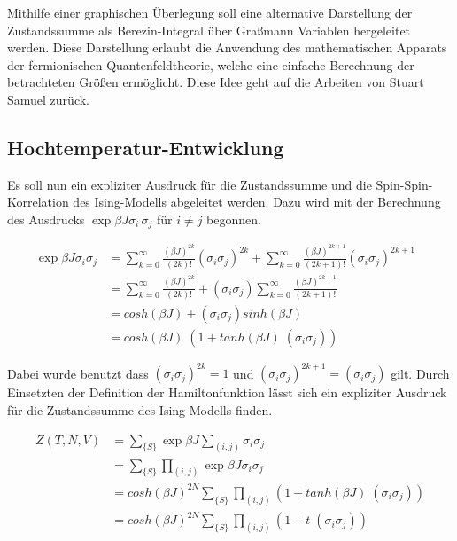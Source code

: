 Mithilfe einer graphischen Überlegung soll eine alternative Darstellung der Zustandssumme als Berezin-Integral über Graßmann Variablen hergeleitet werden. Diese Darstellung erlaubt die Anwendung des mathematischen Apparats der fermionischen Quantenfeldtheorie, welche eine einfache Berechnung der betrachteten Größen ermöglicht. Diese Idee geht auf die Arbeiten von Stuart Samuel zurück. 

\subsection{Hochtemperatur-Entwicklung} 

 \noindent Es soll nun ein expliziter Ausdruck für die Zustandssumme und die Spin-Spin-Korrelation des Ising-Modells abgeleitet werden. Dazu wird mit der Berechnung des Ausdrucks $\exp{\beta J \sigma_i \, \sigma_j} $ für $i \neq j$ begonnen.

\begin{align}
\exp{\beta J \sigma_i \sigma_j} & = \sum_{k=0}^{\infty} \frac{(\beta J)^{2k}}{(2k)!}(\sigma_i \sigma_j)^{2k} + \sum_{k=0}^{\infty} \frac{(\beta J)^{2k+1}}{(2k+1)!}(\sigma_i \sigma_j)^{2k+1}  &\\
& = \sum_{k=0}^{\infty} \frac{(\beta J)^{2k}}{(2k)!} + (\sigma_i \sigma_j) \sum_{k=0}^{\infty} \frac{(\beta J)^{2k+1}}{(2k+1)!} &\\
& = cosh(\beta J) + (\sigma_i \sigma_j) sinh(\beta J) &\\
& = cosh(\beta J) \; (1 +  tanh(\beta J) \; (\sigma_i \sigma_j)) \label{eq: exp(beta J sig sig)}
\end{align}

\noindent Dabei wurde benutzt dass $(\sigma_i \sigma_j)^{2k} = 1$ und $(\sigma_i \sigma_j)^{2k+1} = (\sigma_i \sigma_j)$ gilt. Durch Einsetzten der Definition der Hamiltonfunktion lässt sich ein expliziter Ausdruck für die Zustandssumme des Ising-Modells finden. 

\begin{align} 
    Z(T,N,V) 
    &  = \sum_{\{S\}} \exp{\beta J \sum_{(i,j)} \sigma_i \sigma_j } \\
    &  = \sum_{\{S\}} \prod_{(i,j)} \exp{\beta J \sigma_i \sigma_j } \\
    &  = cosh(\beta J)^{2N} \sum_{\{S\}} \prod_{(i,j)} (1 +  tanh(\beta J) \; (\sigma_i \sigma_j)) \\
    &  = cosh(\beta J)^{2N} \sum_{\{S\}} \prod_{(i,j)} (1 +  t \; (\sigma_i \sigma_j))
\end{align}

